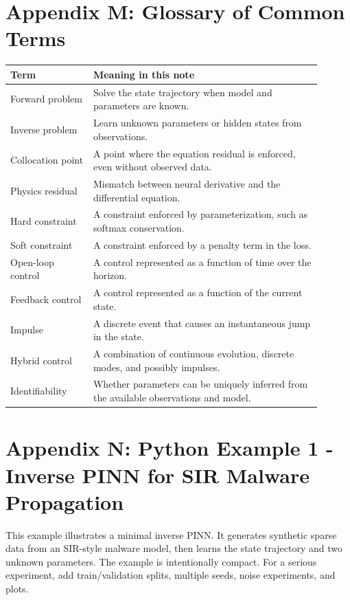 \documentclass[11pt,a4paper]{article}
\begin{document}
\section{Appendix M: Glossary of Common Terms}
\begin{longtable}{p{0.24\linewidth}p{0.66\linewidth}}
\toprule
Term & Meaning in this note \\
\midrule
Forward problem & Solve the state trajectory when model and parameters are known. \\
Inverse problem & Learn unknown parameters or hidden states from observations. \\
Collocation point & A point where the equation residual is enforced, even without observed data. \\
Physics residual & Mismatch between neural derivative and the differential equation. \\
Hard constraint & A constraint enforced by parameterization, such as softmax conservation. \\
Soft constraint & A constraint enforced by a penalty term in the loss. \\
Open-loop control & A control represented as a function of time over the horizon. \\
Feedback control & A control represented as a function of the current state. \\
Impulse & A discrete event that causes an instantaneous jump in the state. \\
Hybrid control & A combination of continuous evolution, discrete modes, and possibly impulses. \\
Identifiability & Whether parameters can be uniquely inferred from the available observations and model. \\
\bottomrule
\end{longtable}


\section{Appendix N: Python Example 1 - Inverse PINN for SIR Malware Propagation}
This example illustrates a minimal inverse PINN. It generates synthetic sparse data from an SIR-style malware model, then learns the state trajectory and two unknown parameters. The example is intentionally compact. For a serious experiment, add train/validation splits, multiple seeds, noise experiments, and plots.
\end{document}
